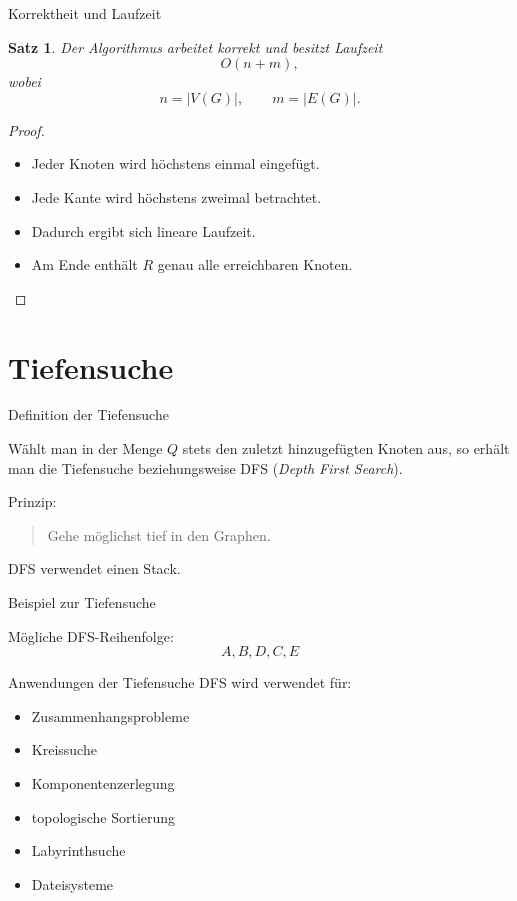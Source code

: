 \documentclass{beamer}
\newtheorem{satz}{Satz}
\begin{document}
\begin{frame}{Korrektheit und Laufzeit}
\begin{satz}
Der Algorithmus arbeitet korrekt und besitzt Laufzeit
\[O(n+m),\]
wobei
\[n=|V(G)|,\qquad m=|E(G)|.\]
\end{satz}
\vspace{0.4cm}
\begin{proof}
\begin{itemize}
    \item Jeder Knoten wird höchstens einmal eingefügt.
    \item Jede Kante wird höchstens zweimal betrachtet.
    \item Dadurch ergibt sich lineare Laufzeit.
    \item Am Ende enthält \(R\) genau alle erreichbaren Knoten.
\end{itemize}
\end{proof}
\end{frame}
\section{Tiefensuche}
\begin{frame}{Definition der Tiefensuche}
\begin{definition}
Wählt man in der Menge \(Q\) stets den zuletzt hinzugefügten Knoten aus, so erhält man die Tiefensuche beziehungsweise DFS (\emph{Depth First Search}).
\end{definition}
\vspace{0.5cm}
Prinzip:
\begin{quote}
Gehe möglichst tief in den Graphen.
\end{quote}
\vspace{0.4cm}
DFS verwendet einen Stack.
\end{frame}
\begin{frame}{Beispiel zur Tiefensuche}
\begin{center}
\end{center}
\vspace{0.3cm}
Mögliche DFS-Reihenfolge:
\[A,B,D,C,E\]
\end{frame}
\begin{frame}{Anwendungen der Tiefensuche}
DFS wird verwendet für:
\begin{itemize}
    \item Zusammenhangsprobleme
    \item Kreissuche
    \item Komponentenzerlegung
    \item topologische Sortierung
    \item Labyrinthsuche
    \item Dateisysteme
\end{itemize}
\end{frame}
\end{document}
